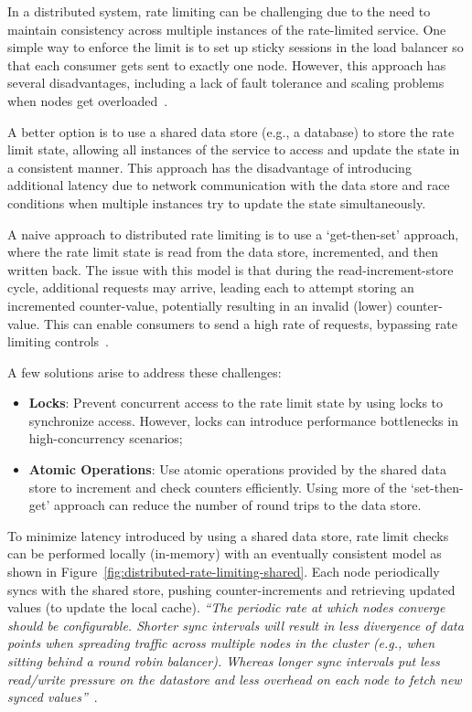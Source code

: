 In a distributed system,
rate limiting can be challenging due to the need
to maintain consistency across multiple instances of the rate-limited service.
One simple way to enforce the limit is
to set up sticky sessions in the load balancer so that each consumer gets sent to exactly one node.
However, this approach has several disadvantages,
including a lack of fault tolerance and scaling problems when nodes get overloaded~\cite{kong-rate-limiting}.

A better option is to use a shared data store (e.g., a database) to store the rate limit state,
allowing all instances of the service to access and update the state in a consistent manner.
This approach has the disadvantage
of introducing additional latency due to network communication with the data store and race conditions when
multiple instances try to update the state simultaneously.

A naive approach to distributed rate limiting is to use a `get-then-set' approach,
where the rate limit state is read from the data store, incremented, and then written back.
The issue with this model is that during the read-increment-store cycle, additional requests may arrive, leading each to attempt storing an incremented counter-value, potentially resulting in an invalid (lower) counter-value.
This can enable consumers to send a high rate of requests, bypassing rate limiting controls~\cite{kong-rate-limiting}.

A few solutions arise to address these challenges:

\begin{itemize}
    \item \textbf{Locks}: Prevent concurrent access to the rate limit state by using locks to synchronize access.
    However, locks can introduce performance bottlenecks in high-concurrency scenarios;
    \item \textbf{Atomic Operations}:
    Use atomic operations provided by the shared data store to increment and check counters efficiently.
    Using more of the `set-then-get' approach can reduce the number of round trips to the data store.
\end{itemize}

To minimize latency introduced by using a shared data store,
rate limit checks can be performed locally (in-memory) with an eventually consistent model as shown in Figure~\ref{fig:distributed-rate-limiting-shared}.
Each node periodically syncs with the shared store,
pushing counter-increments and retrieving updated values (to update the local cache).
\textit{\enquote{The periodic rate at which nodes converge should be configurable. Shorter sync intervals will result in less divergence of data points when spreading traffic across multiple nodes in the cluster (e.g., when sitting behind a round robin balancer). Whereas longer sync intervals put less read/write pressure on the datastore and less overhead on each node to fetch new synced values}}~\cite{kong-rate-limiting}.

